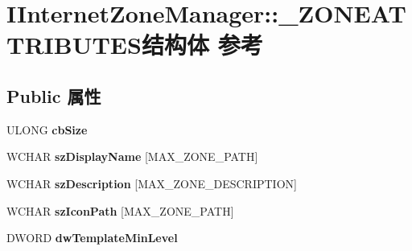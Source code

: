 \hypertarget{struct_i_internet_zone_manager_1_1___z_o_n_e_a_t_t_r_i_b_u_t_e_s}{}\section{I\+Internet\+Zone\+Manager\+:\+:\+\_\+\+Z\+O\+N\+E\+A\+T\+T\+R\+I\+B\+U\+T\+E\+S结构体 参考}
\label{struct_i_internet_zone_manager_1_1___z_o_n_e_a_t_t_r_i_b_u_t_e_s}
\subsection*{Public 属性}
\begin{DoxyCompactItemize}
\item 
\mbox{\label{struct_i_internet_zone_manager_1_1___z_o_n_e_a_t_t_r_i_b_u_t_e_s_a57045021525db7311db308021fb8c590}} 
U\+L\+O\+NG {\bfseries cb\+Size}
\item 
\mbox{\label{struct_i_internet_zone_manager_1_1___z_o_n_e_a_t_t_r_i_b_u_t_e_s_a1c009f89330acd0375f7b0af8aef43c1}} 
W\+C\+H\+AR {\bfseries sz\+Display\+Name} \mbox{[}M\+A\+X\+\_\+\+Z\+O\+N\+E\+\_\+\+P\+A\+TH\mbox{]}
\item 
\mbox{\label{struct_i_internet_zone_manager_1_1___z_o_n_e_a_t_t_r_i_b_u_t_e_s_aa0133f10894166c4106e196c3715a9bb}} 
W\+C\+H\+AR {\bfseries sz\+Description} \mbox{[}M\+A\+X\+\_\+\+Z\+O\+N\+E\+\_\+\+D\+E\+S\+C\+R\+I\+P\+T\+I\+ON\mbox{]}
\item 
\mbox{\label{struct_i_internet_zone_manager_1_1___z_o_n_e_a_t_t_r_i_b_u_t_e_s_a18a59f3d20cf5ff9fd8d10f78b6e93f6}} 
W\+C\+H\+AR {\bfseries sz\+Icon\+Path} \mbox{[}M\+A\+X\+\_\+\+Z\+O\+N\+E\+\_\+\+P\+A\+TH\mbox{]}
\item 
\mbox{\label{struct_i_internet_zone_manager_1_1___z_o_n_e_a_t_t_r_i_b_u_t_e_s_aff9183bac5640b51fae0c1dc3db314df}} 
D\+W\+O\+RD {\bfseries dw\+Template\+Min\+Level}
\item 

\end{DoxyCompactItemize}
